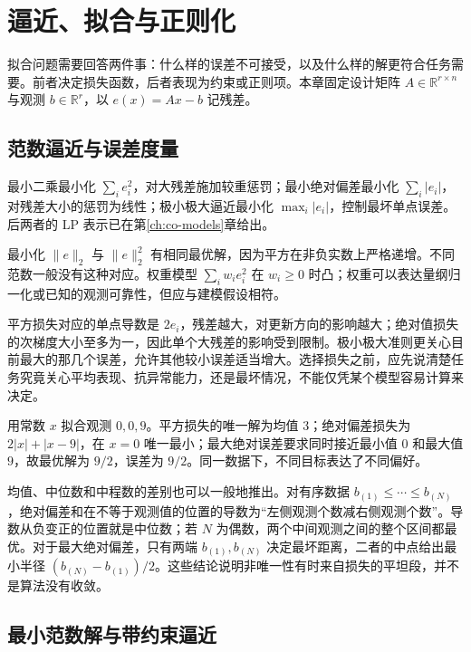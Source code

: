\setcounter{chapter}{5} %
\chapter{逼近、拟合与正则化}
\label{ch:co-fitting}

拟合问题需要回答两件事：什么样的误差不可接受，以及什么样的解更符合任务需要。前者决定损失函数，后者表现为约束或正则项。本章固定设计矩阵 $A\in\mathbb R^{r\times n}$ 与观测 $b\in\mathbb R^r$，以 $e(x)=Ax-b$ 记残差。

\section{范数逼近与误差度量}

最小二乘最小化 $\sum_i e_i^2$，对大残差施加较重惩罚；最小绝对偏差最小化 $\sum_i|e_i|$，对残差大小的惩罚为线性；极小极大逼近最小化 $\max_i|e_i|$，控制最坏单点误差。后两者的 LP 表示已在第\ref{ch:co-models}章给出。

最小化 $\|e\|_2$ 与 $\|e\|_2^2$ 有相同最优解，因为平方在非负实数上严格递增。不同范数一般没有这种对应。权重模型 $\sum_iw_i e_i^2$ 在 $w_i\geq0$ 时凸；权重可以表达量纲归一化或已知的观测可靠性，但应与建模假设相符。

平方损失对应的单点导数是 $2e_i$，残差越大，对更新方向的影响越大；绝对值损失的次梯度大小至多为一，因此单个大残差的影响受到限制。极小极大准则更关心目前最大的那几个误差，允许其他较小误差适当增大。选择损失之前，应先说清楚任务究竟关心平均表现、抗异常能力，还是最坏情况，不能仅凭某个模型容易计算来决定。

\begin{example}[均值、中位数与中程数]
用常数 $x$ 拟合观测 $0,0,9$。平方损失的唯一解为均值 $3$；绝对偏差损失为 $2|x|+|x-9|$，在 $x=0$ 唯一最小；最大绝对误差要求同时接近最小值 $0$ 和最大值 $9$，故最优解为 $9/2$，误差为 $9/2$。同一数据下，不同目标表达了不同偏好。
\end{example}

均值、中位数和中程数的差别也可以一般地推出。对有序数据 $b_{(1)}\leq\cdots\leq b_{(N)}$，绝对偏差和在不等于观测值的位置的导数为“左侧观测个数减右侧观测个数”。导数从负变正的位置就是中位数；若 $N$ 为偶数，两个中间观测之间的整个区间都最优。对于最大绝对偏差，只有两端 $b_{(1)},b_{(N)}$ 决定最坏距离，二者的中点给出最小半径 $(b_{(N)}-b_{(1)})/2$。这些结论说明非唯一性有时来自损失的平坦段，并不是算法没有收敛。

\section{最小范数解与带约束逼近}

